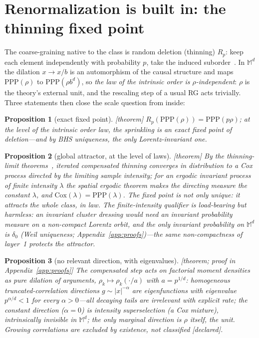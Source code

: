 \documentclass[aps,prd,reprint,nofootinbib,superscriptaddress,floatfix]{revtex4-2}
\newtheorem{proposition}{Proposition}
\theoremstyle{definition}
\begin{document}
\section{Renormalization is built in: the thinning fixed point}
\label{sec:thinning}

The coarse-graining native to the class is random deletion (thinning) $R_p$: keep each
element independently with probability $p$, take the induced suborder~\cite{Surya2019}.
In $\mathbb{M}^d$ the dilation $x\to x/b$ is an automorphism of the causal structure and
maps $\mathrm{PPP}(\rho)$ to $\mathrm{PPP}(\rho b^d)$, so \emph{the law of the intrinsic
order is $\rho$-independent}: $\rho$ is the theory's external unit, and the rescaling
step of a usual RG acts trivially. Three statements then close the scale question from
inside:

\begin{proposition}[exact fixed point]
{\rm[theorem]} $R_p(\mathrm{PPP}(\rho))=\mathrm{PPP}(p\rho)$; at the level of the
intrinsic order law, the sprinkling is an \emph{exact} fixed point of deletion---and by
BHS uniqueness, the only Lorentz-invariant one.
\end{proposition}

\begin{proposition}[global attractor, at the level of laws]
{\rm[theorem]} By the thinning-limit theorems~\cite{Kallenberg2017}, iterated
compensated thinning converges \emph{in distribution} to a Cox process directed by the
limiting sample intensity; for an \emph{ergodic} invariant process of finite intensity
$\lambda$ the spatial ergodic theorem makes the directing measure the constant
$\lambda$, and $\mathrm{Cox}(\lambda)=\mathrm{PPP}(\lambda)$. The fixed point is not
only unique: it attracts the whole class, in law. The finite-intensity qualifier is
load-bearing but harmless: an invariant cluster dressing would need an invariant
probability measure on a non-compact Lorentz orbit, and the only invariant probability
on $\mathbb{M}^d$ is $\delta_0$ (Weil uniqueness; Appendix~\ref{app:proofs})---the same
non-compactness of layer~1 protects the attractor.
\end{proposition}

\begin{proposition}[no relevant direction, with eigenvalues]
{\rm[theorem; proof in Appendix~\ref{app:proofs}]} The compensated step acts on
factorial moment densities as \emph{pure dilation of arguments},
$\rho_k\mapsto\rho_k(\cdot/a)$ with $a=p^{1/d}$: homogeneous truncated-correlation
directions $g\sim|x|^{-\alpha}$ are eigenfunctions with eigenvalue
$p^{\alpha/d}<1$ for every $\alpha>0$---all decaying tails are irrelevant with explicit
rate; the constant direction ($\alpha=0$) is intensity superselection (a Cox mixture),
intrinsically invisible in $\mathbb{M}^d$; the only marginal direction is $\rho$ itself,
the unit. Growing correlations are excluded by existence, not classified [declared].
\end{proposition}
\end{document}
